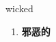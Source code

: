 
\begin{frame}
{\huge wicked}
\begin{center}
\begin{enumerate}\Large
  \item \textbf{邪恶的}
\end{enumerate}
\end{center}
\end{frame}
